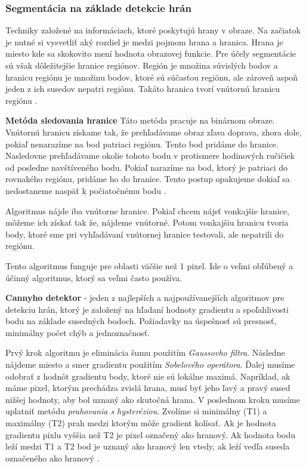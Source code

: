\subsubsection{Segmentácia na základe detekcie hrán}
Techniky založené na informáciach, ktoré poskytujú hrany v obraze. Na začiatok je nutné si vysvetliť aký rozdiel je medzi pojmom hrana a hranica. Hrana je miesto kde sa skokovito mení hodnota obrazovej funkcie. Pre účely segmentácie sú však dôležitejšie hranice regiónov.  Región je množina súvislých bodov a hranicu regiónu je množinu bodov, ktoré sú súčasťou regiónu, ale zároveň aspoň jeden z ich susedov nepatri regiónu. Takáto hranica tvorí vnútornú hranicu regiónu \cite{pocitacove_videnie_v_praxi}. 

\textbf{Metóda sledovania hranice}
\label{sec:follow_border}
Táto metóda pracuje na binárnom obraze. Vnútornú hranicu získame tak, že  prehľadávame obraz zľava doprava, zhora dole, pokiaľ nenarazíme na bod patriaci regiónu. Tento bod pridáme do hranice. Nasledovne prehľadávame okolie tohoto bodu v protismere hodinových ručičiek od posledne navštíveného bodu. Pokiaľ narazíme na bod, ktorý je patriaci do rovnakého regiónu, pridáme ho do hranice. Tento postup opakujeme dokiaľ sa nedostaneme naspäť k počiatočnému bodu \cite{pocitacove_videnie_v_praxi}. 

Algoritmus nájde iba vnútorne hranice. Pokiaľ chcem nájsť vonkajšie hranice, môžeme ich získať tak že, nájdeme vnútorné. Potom vonkajšiu hranicu tvoria body, ktoré sme pri vyhľadávaní vnútornej hranice testovali, ale nepatrili do regiónu. 

Tento algoritmus funguje pre oblasti väčšie než 1 pixel.  Ide o veľmi obľúbený a účinný algoritmus, ktorý sa veľmi často používa.

\textbf{Cannyho detektor} - jeden z najlepších a najpoužívanejších algoritmov pre detekciu hrán, ktorý je založený na hľadaní hodnoty gradientu a spoľahlivosti bodu na základe susedných bodoch. Požiadavky na úspešnosť sú presnosť, minimálny počet chýb a jednoznačnosť. 

Prvý krok algoritmu je eliminácia šumu použitím \textit{Gaussovho filtra}.  Následne nájdeme miesto a smer gradientu použitím \textit{Sobelového operátora}. Ďalej musíme odobrať z hodnôt gradientu  body, ktoré nie sú lokálne maximá. Napríklad, ak máme pixel, ktorým prechádza zvislá hrana, musí byť jeho ľavý a pravý sused nižšej hodnoty, aby bol uznaný  ako skutočná hrana. V poslednom kroku musíme uplatniť metódu \textit{prahovania s hysteréziou}. Zvolíme si minimálny (T1) a maximálny (T2) prah medzi ktorým môže gradient kolísať.  Ak je hodnota gradientu pixlu vyššia než T2 je pixel označený ako hranový. Ak hodnota bodu leží medzi T1 a T2 bod je uznaný ako hranový len vtedy, ak leží vedľa suseda označeného ako hranový \cite{cannyho_detektor}.


